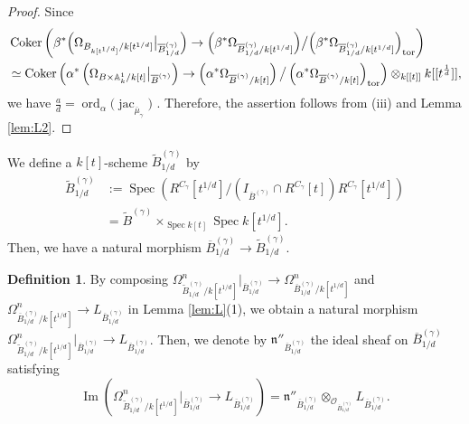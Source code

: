 \documentclass[a4paper,11pt]{amsart}
\theoremstyle{definition}
\newtheorem{defi}[thm]{Definition}
\theoremstyle{remark}
\begin{document}
\begin{proof}
Since 
\begin{align*}
&\operatorname{Coker} \left( \beta ^* \Bigl( \Omega _{B_{k[t^{1/d}]}/k[t^{1/d}]} \big|_{\overline{B}^{(\gamma)}_{1/d}} \Bigr) \to \Bigl ( \beta ^* \Omega _{\overline{B}^{(\gamma)}_{1/d} /k[t^{1/d}]} \Bigr ) \big/ \Bigl ( \beta ^* \Omega _{\overline{B}^{(\gamma)}_{1/d} /k[t^{1/d}]} \Bigr )_{\rm tor} \right) \\ 
&\simeq 
\operatorname{Coker} \left( \alpha ^* \left ( \Omega _{B \times \mathbb{A}_k ^1/k[t]} \big|_{\overline{B}^{(\gamma)}} \right) \to 
\left( \alpha ^* \Omega _{\overline{B}^{(\gamma)}/k[t]} \right) \big/ \left( \alpha ^* \Omega _{\overline{B}^{(\gamma)}/k[t]} \right)_{\rm tor} \right) \otimes_{k[[t]]} k[[t^{\frac{1}{d}}]], 
\end{align*}
we have $\frac{a}{d} = \operatorname{ord}_{\alpha} \bigl( \operatorname{jac}_{\overline{\mu} _{\gamma}} \bigr)$ .
Therefore, the assertion follows from (iii) and Lemma \ref{lem:L2}. 
\end{proof}


We define a $k[t]$-scheme $\widetilde{B}^{(\gamma)}_{1/d}$ by 
\begin{align*}
\widetilde{B}^{(\gamma)}_{1/d}
&:=  \operatorname{Spec} \left( R^{C_{\gamma}}[t^{1/d}] \big/ \left(  I_{\overline{B}^{(\gamma)}} \cap R^{C_{\gamma}}[t] \right) R^{C_{\gamma}}[t^{1/d}] \right) \\
&=  \widetilde{B}^{(\gamma)} \times _{\operatorname{Spec} k[t]} \operatorname{Spec} k[t^{1/d}].
\end{align*}
Then, we have a natural morphism $\overline{B}^{(\gamma)}_{1/d} \to \widetilde{B}^{(\gamma)}_{1/d}$. 

\begin{defi}
By composing $\Omega^n _{\widetilde{B}^{(\gamma)}_{1/d}/k[t^{1/d}]} \big|_{\overline{B}^{(\gamma)}_{1/d}} \to \Omega ^n _{\overline{B}^{(\gamma)}_{1/d}/k[t^{1/d}]}$ and $\Omega ^n _{\overline{B}^{(\gamma)}_{1/d}/k[t^{1/d}]} \to L_{\overline{B}^{(\gamma)}_{1/d}}$ in Lemma \ref{lem:L}(1), 
we obtain a natural morphism $\Omega^n _{\widetilde{B}^{(\gamma)}_{1/d}/k[t^{1/d}]} \big|_{\overline{B}^{(\gamma)}_{1/d}} \to L_{\overline{B}^{(\gamma)}_{1/d}}$. 
Then, we denote by $\mathfrak{n}''_{\overline{B}^{(\gamma)}_{1/d}}$ the ideal sheaf on $\overline{B}^{(\gamma)}_{1/d}$ satisfying
\[
\operatorname{Im} \left( \Omega^n _{\widetilde{B}^{(\gamma)}_{1/d}/k[t^{1/d}]} \big|_{\overline{B}^{(\gamma)}_{1/d}} \to L_{\overline{B}^{(\gamma)}_{1/d}} \right) 
= \mathfrak{n}''_{\overline{B}^{(\gamma)}_{1/d}} \otimes _{\mathcal{O}_{\overline{B}^{(\gamma)}_{1/d}}} L_{\overline{B}^{(\gamma)}_{1/d}}. 
\]
\end{defi}
\end{document}

